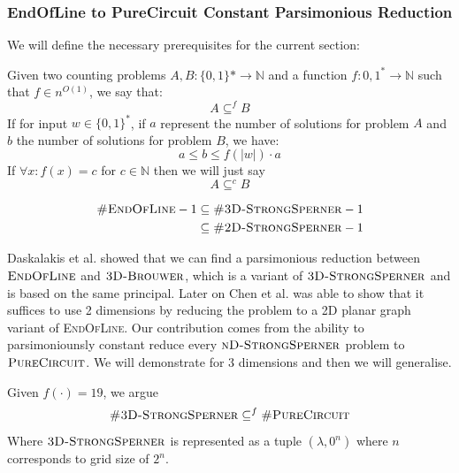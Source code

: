 \subsubsection{EndOfLine to PureCircuit Constant Parsimonious Reduction}

We will define the necessary prerequisites for the current section:

\begin{definition}
    Given two counting problems $A, B : \{0,1\}* \to \mathbb{N}$
    and a function $f : {0,1}^{*} \to \mathbb{N}$ such that $f \in n^{O(1)}$, we
    say that:
    $$
    A \subseteq^f B
    $$
    If for input $w \in \{0,1\}^*$, if $a$ represent the number of solutions
    for problem $A$ and $b$ the number of solutions for problem $B$, we have:
    $$
    a \leq b \leq f(|w|) \cdot a
    $$
    If $\forall x : f(x) = c$ for $c \in \mathbb{N}$ then we will just say 
    $$
    A \subseteq^c B
    $$
\end{definition}

\begin{proposition}
    \begin{align*}
    \textnormal{\textsc{\#EndOfLine}} -1 &\subseteq \textnormal{\textsc{\#3D-StrongSperner}}  -1\\
    &\subseteq \textnormal{\textsc{\#2D-StrongSperner}} -1 \\
    \end{align*}
\end{proposition}

Daskalakis et al. \cite{daskalakis_ComplexityComputingNash_2006} showed that we can find a parsimonious reduction between
$\textnormal{\textsc{EndOfLine}}$ and $\textnormal{\textsc{3D-Brouwer}}$, which is a variant of $\textnormal{\textsc{3D-StrongSperner}}$ and is based on the same principal. Later on
Chen et al. \cite{chen_Complexity2DDiscrete_2009} was able to show that it suffices to use 
2 dimensions by reducing the problem to a 2D planar graph variant of \textsc{EndOfLine}.
Our contribution comes from the ability to parsimoniounsly constant reduce
every $\textnormal{\textsc{nD-StrongSperner}}$ problem to  $\textnormal{\textsc{PureCircuit}}$. We will
demonstrate for 3 dimensions and then we will generalise.

\begin{theorem}
    Given $f(\cdot) = 19$, we argue
    $$
    \textnormal{\textsc{\#3D-StrongSperner}} \subseteq^f \textnormal{\textsc{\#PureCircuit}}
    $$
    Where $\textnormal{\textsc{3D-StrongSperner}}$ is represented as a tuple $(\lambda, 0^n)$
    where $n$ corresponds to grid size of $2^n$.
\end{theorem}

